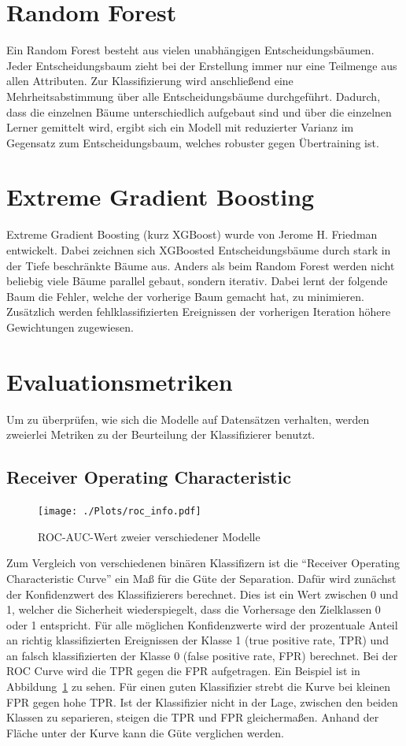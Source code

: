 \section{Random Forest}
Ein Random Forest besteht aus vielen unabhängigen Entscheidungsbäumen.
Jeder Entscheidungsbaum zieht bei der Erstellung immer nur eine Teilmenge aus allen Attributen.
Zur Klassifizierung wird anschließend eine Mehrheitsabstimmung über alle Entscheidungsbäume durchgeführt.
Dadurch, dass die einzelnen Bäume unterschiedlich aufgebaut sind und über die einzelnen Lerner gemittelt wird, ergibt sich ein Modell mit reduzierter Varianz im Gegensatz zum Entscheidungsbaum, welches robuster gegen Übertraining ist.
\section{Extreme Gradient Boosting}
Extreme Gradient Boosting (kurz XGBoost) wurde von Jerome H. Friedman~\cite{xgboost} entwickelt.
Dabei zeichnen sich  XGBoosted Entscheidungsbäume durch stark in der Tiefe beschränkte Bäume aus.
Anders als beim Random Forest werden nicht beliebig viele Bäume parallel gebaut, sondern iterativ. 
Dabei lernt der folgende Baum die Fehler, welche der vorherige Baum gemacht hat, zu minimieren.
Zusätzlich werden fehlklassifizierten Ereignissen der vorherigen Iteration höhere Gewichtungen zugewiesen.

\section{Evaluationsmetriken}
Um zu überprüfen, wie sich die Modelle auf Datensätzen verhalten, werden zweierlei Metriken zu der Beurteilung der Klassifizierer benutzt.
\subsection*{Receiver Operating Characteristic}
\begin{figure}
  \centering
  \texttt{[image: ./Plots/roc\_info.pdf]}
  \caption{ROC-AUC-Wert zweier verschiedener Modelle}
  \label{fig:roc}
\end{figure}
Zum Vergleich von verschiedenen binären Klassifizern ist die \enquote{Receiver Operating Characteristic Curve} ein Maß für die Güte der Separation. 
Dafür wird zunächst der Konfidenzwert des Klassifizierers berechnet. 
Dies ist ein Wert zwischen 0 und 1, welcher die Sicherheit wiederspiegelt, dass die Vorhersage den Zielklassen 0 oder 1 entspricht.
Für alle möglichen Konfidenzwerte wird der prozentuale Anteil an richtig klassifizierten Ereignissen der Klasse 1 (true positive rate, TPR) und an falsch klassifizierten der Klasse 0 (false positive rate, FPR) berechnet. 
Bei der ROC Curve wird die TPR gegen die FPR aufgetragen. 
Ein Beispiel ist in Abbildung~\ref{fig:roc} zu sehen.
Für einen guten Klassifizier strebt die Kurve bei kleinen FPR gegen hohe TPR. 
Ist der Klassifizier nicht in der Lage, zwischen den beiden Klassen zu separieren, steigen die TPR und FPR gleichermaßen. 
Anhand der Fläche unter der Kurve kann die Güte verglichen werden.
